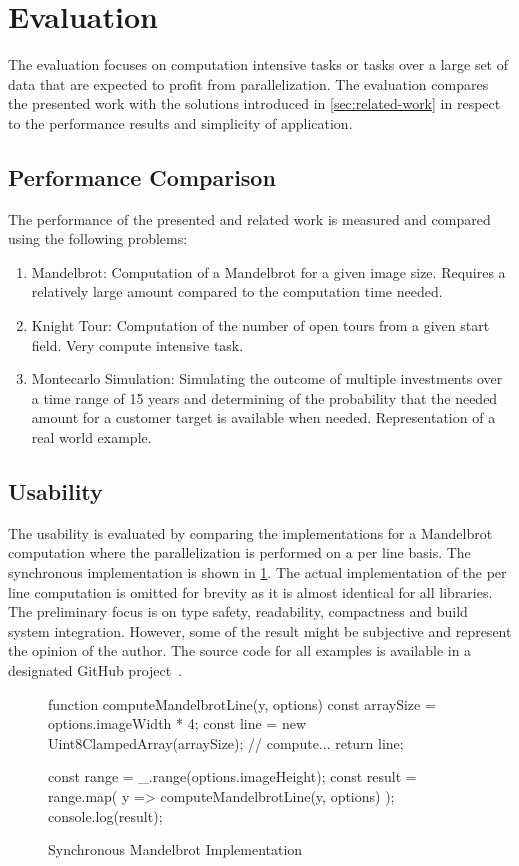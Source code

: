 \section{Evaluation}\label{sec:evaluation}
The evaluation focuses on computation intensive tasks or tasks over a large set of data that are expected to profit from parallelization. The evaluation compares the presented work with the solutions introduced in \cref{sec:related-work} in respect to the performance results and simplicity of application. 

\subsection{Performance Comparison}
The performance of the presented and related work is measured and compared using the following problems:

\begin{enumerate}
	\item Mandelbrot: Computation of a Mandelbrot for a given image size. Requires a relatively large amount compared to the computation time needed.
	\item Knight Tour: Computation of the number of open tours from a given start field. Very compute intensive task. 
	\item Montecarlo Simulation: Simulating the outcome of multiple investments over a time range of 15 years and determining of the probability that the needed amount for a customer target is available when needed. Representation of a real world example.
\end{enumerate}


\subsection{Usability}
The usability is evaluated by comparing the implementations for a Mandelbrot computation where the parallelization is performed on a per line basis. The synchronous implementation is shown in \cref{fig:mandelbrot-sync}. The actual implementation of the per line computation is omitted for brevity as it is almost identical for all libraries. The preliminary focus is on type safety, readability, compactness and build system integration. However, some of the result might be subjective and represent the opinion of the author. The source code for all examples is available in a designated GitHub project~\cite{Reiser2016}. 

\begin{figure}
	
	\begin{javascriptcode}
function computeMandelbrotLine(y, options) {
	const arraySize = options.imageWidth * 4;
	const line = new Uint8ClampedArray(arraySize);
	// compute...
	return line;
}

const range = _.range(options.imageHeight);
const result = range.map(
	y => computeMandelbrotLine(y, options)
);
console.log(result);
\end{javascriptcode}
\caption{Synchronous Mandelbrot Implementation}
\label{fig:mandelbrot-sync}
\end{figure}

